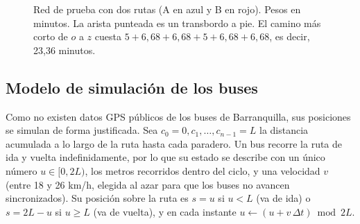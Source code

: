 \documentclass[12pt,letterpaper]{article}
\begin{document}
\begin{figure}[H]
\centering
{}
\caption{Red de prueba con dos rutas (A en azul y B en rojo). Pesos en minutos. La arista punteada es un transbordo a pie. El camino más corto de $o$ a $z$ cuesta $5+6{,}68+6{,}68+5+6{,}68+6{,}68$, es decir, 23,36 minutos.}\label{fig:juguete}
\end{figure}

\subsection{Modelo de simulación de los buses}
Como no existen datos GPS públicos de los buses de Barranquilla, sus posiciones se simulan de forma justificada. Sea $c_0=0, c_1,\dots,c_{n-1}=L$ la distancia acumulada a lo largo de la ruta hasta cada paradero. Un bus recorre la ruta de ida y vuelta indefinidamente, por lo que su estado se describe con un único número $u\in[0,2L)$, los metros recorridos dentro del ciclo, y una velocidad $v$ (entre 18 y 26 km/h, elegida al azar para que los buses no avancen sincronizados). Su posición sobre la ruta es $s=u$ si $u<L$ (va de ida) o $s=2L-u$ si $u\ge L$ (va de vuelta), y en cada instante $u\leftarrow (u+v\,\Delta t) \bmod 2L$.
\end{document}
